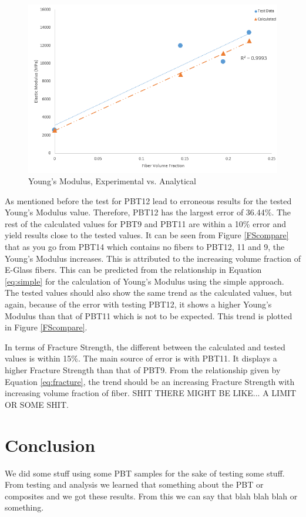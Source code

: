 \documentclass[11pt]{article}
\begin{document}
\begin{figure}[H]
\centering
\includegraphics[width=.95\linewidth]{figures/modulus_test_vs_calc.png}
\caption{Young's Modulus, Experimental vs. Analytical}
\label{ModulusCompare}
\end{figure}

As mentioned before the test for PBT12 lead to erroneous results for the tested Young's Modulus value. Therefore, PBT12 has the largest error of 36.44\%. The rest of the calculated values for PBT9 and PBT11 are within a 10\% error and yield results close to the tested values. It can be seen from Figure \ref{FScompare} that as you go from PBT14 which contains no fibers to PBT12, 11 and  9, the Young's Modulus increases. This is attributed to the increasing volume fraction of E-Glass fibers. This can be predicted from the relationship in Equation \ref{eq:simple} for the calculation of Young's Modulus using the simple approach. The tested values should also show the same trend as the calculated values, but again, because of the error with testing PBT12, it shows a higher Young's Modulus than that of PBT11 which is not to be expected. This trend is plotted in Figure \ref{FScompare}.
\singlespacing

In terms of Fracture Strength, the different between the calculated and tested values is within 15\%. The main source of error is with PBT11. It displays a higher Fracture Strength than that of PBT9. From the relationship given by Equation \ref{eq:fracture}, the trend should be an increasing Fracture Strength with increasing volume fraction of fiber. SHIT THERE MIGHT BE LIKE... A LIMIT OR SOME SHIT.


\section{Conclusion}
We did some stuff using some PBT samples for the sake of testing some stuff. From testing and analysis we learned that something about the PBT or composites and we got these results. From this we can say that blah blah blah or something. 
\end{document}
